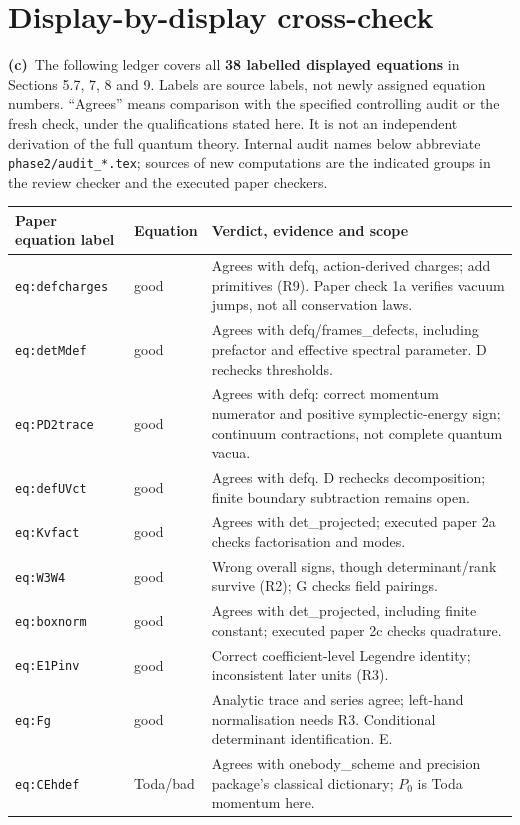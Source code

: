 \documentclass[11pt,a4paper]{article}
\newcommand{\C}{\textbf{(c)}\ }
\newcommand{\file}[1]{\nolinkurl{#1}}
\begin{document}
\section{Display-by-display cross-check}
\C The following ledger covers all \textbf{38 labelled displayed equations}
in Sections 5.7, 7, 8 and 9. Labels are source labels, not newly assigned
equation numbers. ``Agrees'' means comparison with the specified controlling
audit or the fresh check, under the qualifications stated here. It is not
an independent derivation of the full quantum theory. Internal audit names
below abbreviate \file{phase2/audit_*.tex}; sources of new computations are
the indicated groups in the review checker and the executed paper checkers.
\small
\begin{longtable}{@{}L{3.0cm}L{1.6cm}L{10.6cm}@{}}
\toprule Paper equation label & Equation & Verdict, evidence and scope\\\midrule\endhead
\file{eq:defcharges} & good & Agrees with defq, action-derived charges; add primitives (R9). Paper check 1a verifies vacuum jumps, not all conservation laws.\\
\file{eq:detMdef} & good & Agrees with defq/frames\_defects, including prefactor and effective spectral parameter. D rechecks thresholds.\\
\file{eq:PD2trace} & good & Agrees with defq: correct momentum numerator and positive symplectic-energy sign; continuum contractions, not complete quantum vacua.\\
\file{eq:defUVct} & good & Agrees with defq. D rechecks decomposition; finite boundary subtraction remains open.\\
\file{eq:Kvfact} & good & Agrees with det\_projected; executed paper 2a checks factorisation and modes.\\
\file{eq:W3W4} & good & Wrong overall signs, though determinant/rank survive (R2); G checks field pairings.\\
\file{eq:boxnorm} & good & Agrees with det\_projected, including finite constant; executed paper 2c checks quadrature.\\
\file{eq:E1Pinv} & good & Correct coefficient-level Legendre identity; inconsistent later units (R3).\\
\file{eq:Fg} & good & Analytic trace and series agree; left-hand normalisation needs R3. Conditional determinant identification. E.\\
\file{eq:CEhdef} & Toda/bad & Agrees with onebody\_scheme and precision package's classical dictionary; $P_0$ is Toda momentum here.\\

\end{longtable}
\end{document}
